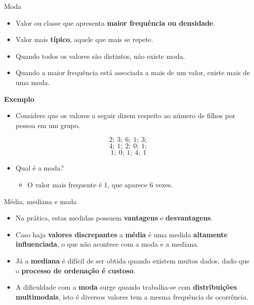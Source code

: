 \documentclass[
  ignorenonframetext,
  serif,
  professionalfont,
  usenames,
  dvipsnames,
  aspectratio = 169]{beamer}
\providecommand{\tightlist}{%
  \setlength{\itemsep}{0pt}\setlength{\parskip}{0pt}}
\renewcommand{\tightlist}{%
  \setlength{\itemsep}{0\baselineskip}
  \setlength{\parskip}{0.25\baselineskip}
}
\def\beginAHalfColumn{\begin{minipage}{0.49\textwidth}}%
\def\endColumns{\end{minipage}}%
\begin{document}
\begin{frame}{Moda}
\label{moda}
\beginAHalfColumn

\begin{itemize}
\tightlist
\item
  Valor ou classe que apresenta \textbf{maior frequência ou densidade}.
\item
  Valor mais \textbf{típico}, aquele que mais se repete.
\item
  Quando todos os valores são distintos, não existe moda.
\item
  Quando a maior frequência está associada a mais de um valor, existe
  mais de uma moda.
\end{itemize}

\endColumns
\beginAHalfColumn

\textbf{Exemplo}

\begin{itemize}
\tightlist
\item
  Considere que os valores a seguir dizem respeito ao número de filhos
  por pessoa em um grupo.
\end{itemize}

\[2;\ 3;\ 6;\ 1;\ 3;\] \[4;\ 1;\ 2;\ 0;\ 1;\] \[1;\ 0;\ 1;\ 4;\ 1\]

\begin{itemize}
\tightlist
\item
  Qual é a moda?

  \begin{itemize}
  \tightlist
  \item
    O valor mais frequente é \(1\), que aparece 6 vezes.
  \end{itemize}
\end{itemize}

\endColumns
\end{frame}

\begin{frame}{Média, mediana e moda}
\label{muxe9dia-mediana-e-moda}
\begin{itemize}
\item
  Na prática, estas medidas possuem \textbf{vantagens} e
  \textbf{desvantagens}.
\item
  Caso haja \textbf{valores discrepantes} a \textbf{média} é uma medida
  \textbf{altamente influenciada}, o que não acontece com a moda e a
  mediana.
\item
  Já a \textbf{mediana} é difícil de ser obtida quando existem muitos
  dados, dado que o \textbf{processo de ordenação é custoso}.
\item
  A dificuldade com a \textbf{moda} surge quando trabalha-se com
  \textbf{distribuições multimodais}, isto é diversos valores tem a
  mesma frequência de ocorrência.
\end{itemize}
\end{frame}
\end{document}
